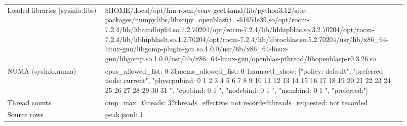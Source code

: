 \begin{longtable}{>{\raggedright\arraybackslash}p{0.23\linewidth}>{\raggedright\arraybackslash}p{0.71\linewidth}}
Loaded libraries (sysinfo.libs) & \$HOME/\allowbreak{}.local/\allowbreak{}opt/\allowbreak{}fnn-rocm/\allowbreak{}venv-gcc14amd/\allowbreak{}lib/\allowbreak{}python3.12/\allowbreak{}site-packages/\allowbreak{}numpy.libs/\allowbreak{}libscipy\_\allowbreak{}openblas64\_\allowbreak{}-61654e39.so\newline /\allowbreak{}opt/\allowbreak{}rocm-7.2.4/\allowbreak{}lib/\allowbreak{}libamdhip64.so.7.2.70204\newline /\allowbreak{}opt/\allowbreak{}rocm-7.2.4/\allowbreak{}lib/\allowbreak{}libhipblas.so.3.2.70204\newline /\allowbreak{}opt/\allowbreak{}rocm-7.2.4/\allowbreak{}lib/\allowbreak{}libhipblaslt.so.1.2.70204\newline /\allowbreak{}opt/\allowbreak{}rocm-7.2.4/\allowbreak{}lib/\allowbreak{}librocblas.so.5.2.70204\newline /\allowbreak{}usr/\allowbreak{}lib/\allowbreak{}x86\_\allowbreak{}64-linux-gnu/\allowbreak{}libgomp-plugin-gcn.so.1.0.0\newline /\allowbreak{}usr/\allowbreak{}lib/\allowbreak{}x86\_\allowbreak{}64-linux-gnu/\allowbreak{}libgomp.so.1.0.0\newline /\allowbreak{}usr/\allowbreak{}lib/\allowbreak{}x86\_\allowbreak{}64-linux-gnu/\allowbreak{}openblas-pthread/\allowbreak{}libopenblasp-r0.3.26.so \\
NUMA (sysinfo.numa) & cpus\_\allowbreak{}allowed\_\allowbreak{}list: 0-31\newline mems\_\allowbreak{}allowed\_\allowbreak{}list: 0-1\newline numactl\_\allowbreak{}show: ["policy: default", "preferred node: current", "physcpubind: 0 1 2 3 4 5 6 7 8 9 10 11 12 13 14 15 16 17 18 19 20 21 22 23 24 25 26 27 28 29 30 31 ", "cpubind: 0 1 ", "nodebind: 0 1 ", "membind: 0 1 ", "preferred:"] \\
Thread counts & omp\_\allowbreak{}max\_\allowbreak{}threads: 32\newline threads\_\allowbreak{}effective: not recorded\newline threads\_\allowbreak{}requested: not recorded \\
Source rows & peak.jsonl: 1 \\
\end{longtable}
